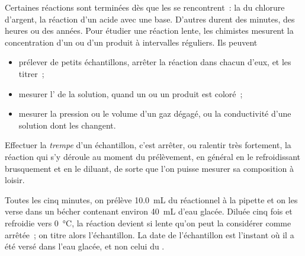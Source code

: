 Certaines réactions sont terminées dès que les  se rencontrent~:
la  du chlorure d'argent, la réaction d'un acide avec une
base. D'autres durent des minutes, des heures ou des années. Pour
étudier une réaction lente, les chimistes mesurent la concentration d'un
 ou d'un produit à intervalles réguliers. Ils peuvent
\begin{itemize}
  \item prélever de petits échantillons, arrêter la réaction dans chacun
        d'eux, et les titrer~;
  \item mesurer l' de la solution, quand un  ou un
        produit est coloré~;
  \item mesurer la pression ou le volume d'un gaz dégagé, ou la
        conductivité d'une solution dont les  changent.
\end{itemize}

\begin{definition}[Trempe]\label{def:g12:reaction-rates:quenching}
Effectuer la \emph{trempe} d'un échantillon, c'est arrêter,
ou ralentir très fortement, la réaction qui s'y déroule au moment du
prélèvement, en général en le refroidissant brusquement et en le
diluant, de sorte que l'on puisse mesurer sa composition à loisir.
\end{definition}

\begin{inthelab}
Toutes les cinq minutes, on prélève \qty{10.0}{mL} du 
réactionnel à la pipette et on les verse dans un bécher contenant
environ \qty{40}{mL} d'eau glacée. Diluée cinq fois et refroidie vers
\qty{0}{\celsius}, la réaction devient si lente qu'on peut la considérer
comme arrêtée~; on titre alors l'échantillon. La date de l'échantillon
est l'instant où il a été versé dans l'eau glacée, et non celui du
.
\end{inthelab}

